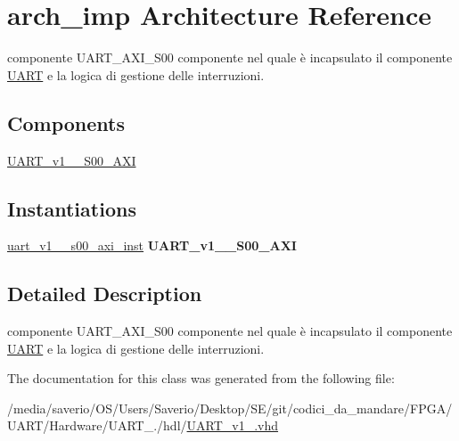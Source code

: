 \hypertarget{classUART__v1__0_1_1arch__imp}{}\section{arch\+\_\+imp Architecture Reference}
\label{classUART__v1__0_1_1arch__imp}


componente U\+A\+R\+T\+\_\+\+A\+X\+I\+\_\+\+S00  componente nel quale è incapsulato il componente \hyperlink{structUART}{U\+A\+RT} e la logica di gestione delle interruzioni.  


\subsection*{Components}
 \begin{DoxyCompactItemize}
\item 
\mbox{\label{classUART__v1__0_1_1arch__imp_a554bf35242758ea2c6cdb41b3a146b89}} 
\hyperlink{classUART__v1__0_1_1arch__imp_a554bf35242758ea2c6cdb41b3a146b89}{U\+A\+R\+T\+\_\+v1\+\_\+\_\+\+S00\+\_\+\+A\+XI}  {\bfseries }  
\end{DoxyCompactItemize}
\subsection*{Instantiations}
 \begin{DoxyCompactItemize}
\item 
\mbox{\label{classUART__v1__0_1_1arch__imp_af8995827bb89a3b54bf57d79330e4cf5}} 
\hyperlink{classUART__v1__0_1_1arch__imp_af8995827bb89a3b54bf57d79330e4cf5}{uart\+\_\+v1\+\_\+\_\+s00\+\_\+axi\+\_\+inst}  {\bfseries U\+A\+R\+T\+\_\+v1\+\_\+\_\+\+S00\+\_\+\+A\+XI}   
\end{DoxyCompactItemize}


\subsection{Detailed Description}
componente U\+A\+R\+T\+\_\+\+A\+X\+I\+\_\+\+S00  componente nel quale è incapsulato il componente \hyperlink{structUART}{U\+A\+RT} e la logica di gestione delle interruzioni. 

The documentation for this class was generated from the following file\+:\begin{DoxyCompactItemize}
\item 
/media/saverio/\+O\+S/\+Users/\+Saverio/\+Desktop/\+S\+E/git/codici\+\_\+da\+\_\+mandare/\+F\+P\+G\+A/\+U\+A\+R\+T/\+Hardware/\+U\+A\+R\+T\+\_./hdl/\hyperlink{UART__v1__0_8vhd}{U\+A\+R\+T\+\_\+v1\+\_.\+vhd}\end{DoxyCompactItemize}
